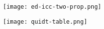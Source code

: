 \documentclass[aspectratio=169,xcolor=dvipsnames]{beamer}
\begin{document}
\begin{frame}

    \begin{figure}[htbp]
        \centering
        \texttt{[image: ed-icc-two-prop.png]} 
    \end{figure}
    

\end{frame}



\begin{frame}[label=res-table]

    \begin{figure}[htbp]
        \centering
        \texttt{[image: quidt-table.png]} 
    \end{figure}
    \hyperlink{magnitudes}{}

\end{frame}
\end{document}
